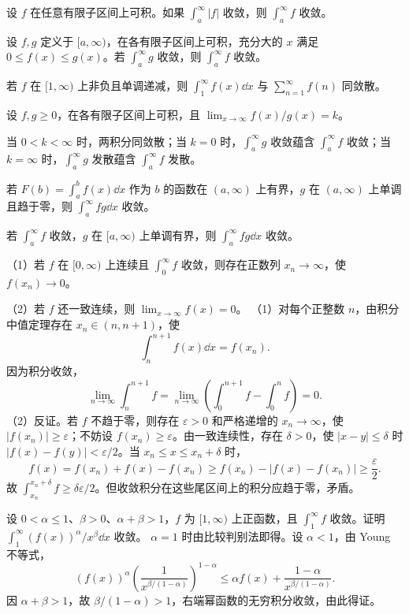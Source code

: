 设 $f$ 在任意有限子区间上可积。如果 $\int_a^\infty|f|$ 收敛，则 $\int_a^\infty f$ 收敛。

设 $f,g$ 定义于 $[a,\infty)$，在各有限子区间上可积，充分大的 $x$ 满足 $0\le f(x)\le g(x)$。若 $\int_a^\infty g$ 收敛，则 $\int_a^\infty f$ 收敛。

若 $f$ 在 $[1,\infty)$ 上非负且单调递减，则 $\int_1^\infty f(x)\dd x$ 与 $\sum_{n=1}^\infty f(n)$ 同敛散。

设 $f,g\ge0$，在各有限子区间上可积，且 $\lim_{x\to\infty}f(x)/g(x)=k$。

当 $0<k<\infty$ 时，两积分同敛散；当 $k=0$ 时，$\int_a^\infty g$ 收敛蕴含 $\int_a^\infty f$ 收敛；当 $k=\infty$ 时，$\int_a^\infty g$ 发散蕴含 $\int_a^\infty f$ 发散。

若 $F(b)=\int_a^bf(x)\dd x$ 作为 $b$ 的函数在 $(a,\infty)$ 上有界，$g$ 在 $(a,\infty)$ 上单调且趋于零，则 $\int_a^\infty fg\dd x$ 收敛。

若 $\int_a^\infty f$ 收敛，$g$ 在 $[a,\infty)$ 上单调有界，则 $\int_a^\infty fg\dd x$ 收敛。

（1）若 $f$ 在 $[0,\infty)$ 上连续且 $\int_0^\infty f$ 收敛，则存在正数列 $x_n\to\infty$，使 $f(x_n)\to0$。

（2）若 $f$ 还一致连续，则 $\lim_{x\to\infty}f(x)=0$。
\prooftext （1）对每个正整数 $n$，由积分中值定理存在 $x_n\in(n,n+1)$，使
\[
\int_n^{n+1}f(x)\dd x=f(x_n).
\]
因为积分收敛，
\[
\lim_{n\to\infty}\int_n^{n+1}f
=\lim_{n\to\infty}\left(\int_0^{n+1}f-\int_0^nf\right)=0.
\]
（2）反证。若 $f$ 不趋于零，则存在 $\varepsilon>0$ 和严格递增的 $x_n\to\infty$，使 $|f(x_n)|\ge\varepsilon$；不妨设 $f(x_n)\ge\varepsilon$。由一致连续性，存在 $\delta>0$，使 $|x-y|\le\delta$ 时 $|f(x)-f(y)|<\varepsilon/2$。当 $x_n\le x\le x_n+\delta$ 时，
\[
f(x)=f(x_n)+f(x)-f(x_n)\ge f(x_n)-|f(x)-f(x_n)|\ge\frac\varepsilon2.
\]
故 $\int_{x_n}^{x_n+\delta}f\ge\delta\varepsilon/2$。但收敛积分在这些尾区间上的积分应趋于零，矛盾。

设 $0<\alpha\le1$、$\beta>0$、$\alpha+\beta>1$，$f$ 为 $[1,\infty)$ 上正函数，且 $\int_1^\infty f$ 收敛。证明 $\int_1^\infty(f(x))^\alpha/x^\beta\dd x$ 收敛。
\prooftext $\alpha=1$ 时由比较判别法即得。设 $\alpha<1$，由 Young 不等式，
\[
(f(x))^\alpha\left(\frac1{x^{\beta/(1-\alpha)}}\right)^{1-\alpha}
\le\alpha f(x)+\frac{1-\alpha}{x^{\beta/(1-\alpha)}}.
\]
因 $\alpha+\beta>1$，故 $\beta/(1-\alpha)>1$，右端幂函数的无穷积分收敛，由此得证。

